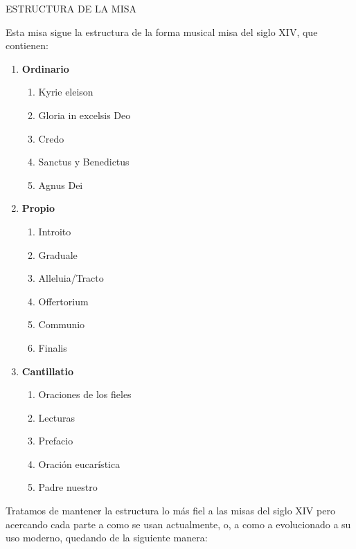\documentclass[12pt, letterpaper]{report}
\begin{document}
    {\large ESTRUCTURA DE LA MISA}

    Esta misa sigue la estructura de la forma musical misa del siglo XIV, que contienen:

    \renewcommand{\theenumi}{\arabic{enumi}}
    \begin{enumerate}
        \item \textbf{Ordinario}
        \begin{enumerate}
            \item Kyrie eleison
            \item Gloria in excelsis Deo
            \item Credo
            \item Sanctus y Benedictus
            \item Agnus Dei
        \end{enumerate}

        \item \textbf{Propio}
        \begin{enumerate}
            \item Introito
            \item Graduale
            \item Alleluia/Tracto
            \item Offertorium
            \item Communio
            \item Finalis
        \end{enumerate}

        \item \textbf{Cantillatio}
        \begin{enumerate}
            \item Oraciones de los fieles
            \item Lecturas
            \item Prefacio
            \item Oraci\'on eucar\'istica
            \item Padre nuestro
        \end{enumerate}
    \end{enumerate}

    Tratamos de mantener la estructura lo m\'as fiel a las misas del siglo XIV pero acercando cada parte a como se usan actualmente, o, a como a evolucionado a su uso moderno, quedando de la siguiente manera:
\end{document}
